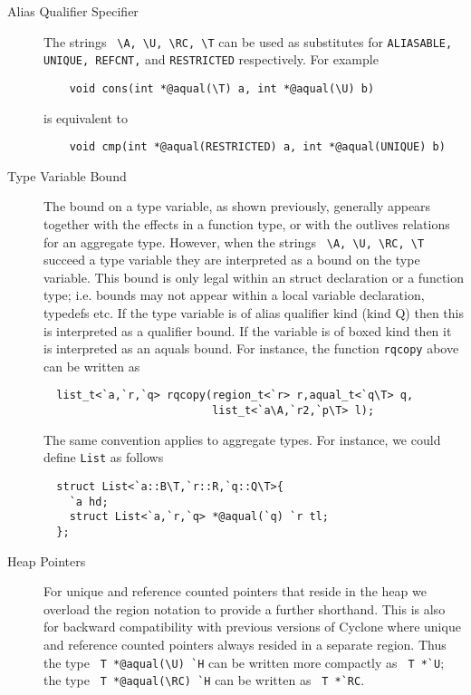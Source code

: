 \begin{description}
\item[Alias Qualifier Specifier] The strings \verb+ \A, \U, \RC, \T+
  can be used as substitutes for {\tt ALIASABLE, UNIQUE, REFCNT,} and
  {\tt RESTRICTED} respectively. For example
  \begin{verbatim}
    void cons(int *@aqual(\T) a, int *@aqual(\U) b)
  \end{verbatim} 
  is equivalent to 
  \begin{verbatim}
    void cmp(int *@aqual(RESTRICTED) a, int *@aqual(UNIQUE) b)
  \end{verbatim}
  
\item[Type Variable Bound] The bound on a type variable, as shown
  previously, generally appears together with the effects in a
  function type, or with the outlives relations for an aggregate
  type. However, when the strings \verb+ \A, \U, \RC, \T+ succeed a
  type variable they are interpreted as a bound on the type
  variable. This bound is only legal within an struct declaration or a
  function type; i.e. bounds may not appear within a local variable
  declaration, typedefs etc. If the type variable is of alias
  qualifier kind (kind Q) then this is interpreted as a qualifier
  bound. If the variable is of boxed kind then it is interpreted as an
  aquals bound. For instance, the function {\tt rqcopy} above can be
  written as
  
  \begin{verbatim}
  list_t<`a,`r,`q> rqcopy(region_t<`r> r,aqual_t<`q\T> q,
                          list_t<`a\A,`r2,`p\T> l);
  \end{verbatim}
  
  The same convention applies to aggregate types. For instance, we
  could define {\tt List} as follows

  \begin{verbatim}
  struct List<`a::B\T,`r::R,`q::Q\T>{ 
    `a hd; 
    struct List<`a,`r,`q> *@aqual(`q) `r tl;
  };
  \end{verbatim}

\item[Heap Pointers] For unique and reference counted pointers that
  reside in the heap we overload the region notation to provide a
  further shorthand. This is also for backward compatibility with
  previous versions of Cyclone where unique and reference counted
  pointers always resided in a separate region. Thus the type
  \verb+ T *@aqual(\U) `H+ can be written more compactly as
  \verb+ T *`U+; the type \verb+ T *@aqual(\RC) `H+ can be written as
  \verb+ T *`RC+.

\end{description}

